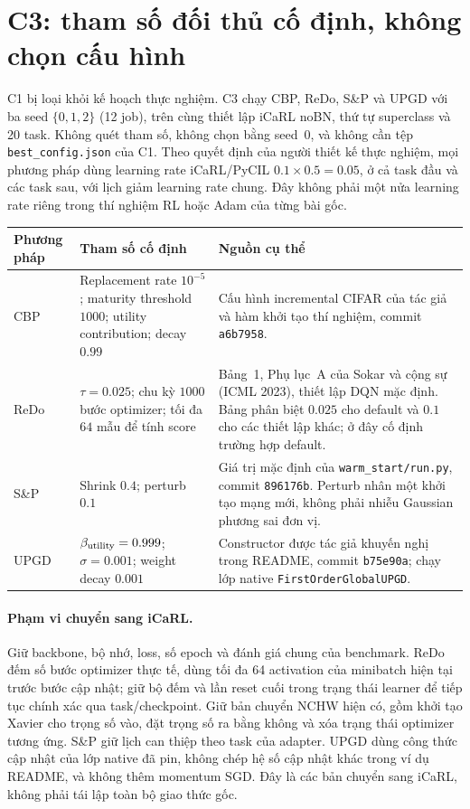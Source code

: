 \section{C3: tham số đối thủ cố định, không chọn cấu hình}\label{app:c3-defaults}

C1 bị loại khỏi kế hoạch thực nghiệm. C3 chạy CBP, ReDo, S\&P và UPGD
với ba seed $\{0,1,2\}$ (12 job), trên cùng thiết lập iCaRL noBN,
thứ tự superclass và 20 task. Không quét tham số, không chọn bằng seed~0,
và không cần tệp \texttt{best\_config.json} của C1.
Theo quyết định của người thiết kế thực nghiệm, mọi phương pháp dùng
learning rate iCaRL/PyCIL $0.1\times0.5=0.05$, ở cả task đầu và các task sau,
với lịch giảm learning rate chung. Đây không phải một nửa learning rate
riêng trong thí nghiệm RL hoặc Adam của từng bài gốc.

\begin{tabularx}{\linewidth}{@{}lXX@{}}
\toprule
Phương pháp & Tham số cố định & Nguồn cụ thể \\
\midrule
CBP & Replacement rate $10^{-5}$; maturity threshold $1000$;
utility contribution; decay $0.99$ & Cấu hình incremental CIFAR của tác giả
và hàm khởi tạo thí nghiệm, commit \texttt{a6b7958}. \\
ReDo & $\tau=0.025$; chu kỳ $1000$ bước optimizer; tối đa $64$ mẫu
để tính score & Bảng~1, Phụ lục~A của Sokar và cộng sự (ICML 2023),
thiết lập DQN mặc định. Bảng phân biệt $0.025$ cho default và $0.1$ cho các
thiết lập khác; ở đây cố định trường hợp default. \\
S\&P & Shrink $0.4$; perturb $0.1$ & Giá trị mặc định của
\texttt{warm\_start/run.py}, commit \texttt{896176b}. Perturb nhân một
khởi tạo mạng mới, không phải nhiễu Gaussian phương sai đơn vị. \\
UPGD & $\beta_{\rm utility}=0.999$; $\sigma=0.001$;
weight decay $0.001$ & Constructor được tác giả khuyến nghị trong README,
commit \texttt{b75e90a}; chạy lớp native \texttt{FirstOrderGlobalUPGD}. \\
\bottomrule
\end{tabularx}

\paragraph{Phạm vi chuyển sang iCaRL.}
Giữ backbone, bộ nhớ, loss, số epoch và đánh giá chung của benchmark.
ReDo đếm số bước optimizer thực tế, dùng tối đa 64 activation của minibatch
hiện tại trước bước cập nhật; giữ bộ đếm và lần reset cuối trong trạng thái
learner để tiếp tục chính xác qua task/checkpoint. Giữ bản chuyển NCHW
hiện có, gồm khởi tạo Xavier cho trọng số vào, đặt trọng số ra bằng không
và xóa trạng thái optimizer tương ứng. S\&P giữ lịch can thiệp theo task
của adapter. UPGD dùng công thức cập nhật của lớp native đã pin, không
chép hệ số cập nhật khác trong ví dụ README, và không thêm momentum SGD.
Đây là các bản chuyển sang iCaRL, không phải tái lập toàn bộ giao thức gốc.

